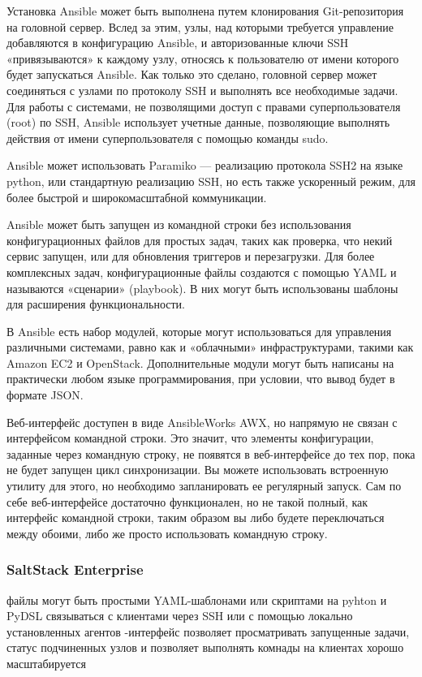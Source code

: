 \documentclass{../industrial-development}
\begin{document}
Установка Ansible может быть выполнена путем клонирования Git-репозитория на головной сервер. Вслед за этим, узлы, над которыми требуется управление добавляются в конфигурацию Ansible, и авторизованные ключи SSH «привязываются» к каждому узлу, относясь к пользователю от имени которого будет запускаться Ansible. Как только это сделано, головной сервер может соединяться с узлами по протоколу SSH и выполнять все необходимые задачи. Для работы с системами, не позволящими доступ с правами суперпользователя (root) по SSH, Ansible использует учетные данные, позволяющие выполнять действия от имени суперпользователя с помощью команды sudo.

Ansible может использовать Paramiko — реализацию протокола SSH2 на языке python, или стандартную реализацию SSH, но есть также ускоренный режим, для более быстрой и широкомасштабной коммуникации.

Ansible может быть запущен из командной строки без использования конфигурационных файлов для простых задач, таких как проверка, что некий сервис запущен, или для обновления триггеров и перезагрузки. Для более комплексных задач, конфигурационные файлы создаются с помощью YAML и называются «сценарии» (playbook). В них могут быть использованы шаблоны для расширения функциональности.

В Ansible есть набор модулей, которые могут использоваться для управления различными системами, равно как и «облачными» инфраструктурами, такими как Amazon EC2 и OpenStack. Дополнительные модули могут быть написаны на практически любом языке программирования, при условии, что вывод будет в формате JSON.

Веб-интерфейс доступен в виде AnsibleWorks AWX, но напрямую не связан с интерфейсом командной строки. Это значит, что элементы конфигурации, заданные через командную строку, не появятся в веб-интерфейсе до тех пор, пока не будет запущен цикл синхронизации. Вы можете использовать встроенную утилиту для этого, но необходимо запланировать ее регулярный запуск. Сам по себе веб-интерфейсе достаточно функционален, но не такой полный, как интерфейс командной строки, таким образом вы либо будете переключаться между обоими, либо же просто использовать командную строку. 
~\cite{Instruments}
\begin{frame} \frametitle{SaltStack Enterprise}
  
  \begin{itemize}
 файлы могут быть простыми YAML-шаблонами или скриптами на pyhton и PyDSL
 связываться с клиентами через SSH или с помощью локально установленных агентов
-интерфейс позволяет просматривать запущенные задачи, статус подчиненных узлов и позволяет выполнять комнады на клиентах
 хорошо масштабируется

  \end{itemize}
\end{frame}
\end{document}
